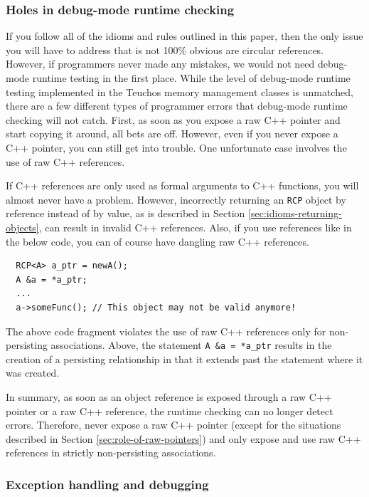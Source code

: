 \documentclass[pdf,ps2pdf,11pt]{SANDreport}
\begin{document}
%
{}\subsubsection{Holes in debug-mode runtime checking}
%

If you follow all of the idioms and rules outlined in this paper, then
the only issue you will have to address that is not 100\% obvious are
circular references.  However, if programmers never made any mistakes,
we would not need debug-mode runtime testing in the first place.
While the level of debug-mode runtime testing implemented in the
Teuchos memory management classes is unmatched, there are a few
different types of programmer errors that debug-mode runtime checking
will not catch.  First, as soon as you expose a raw C++ pointer and
start copying it around, all bets are off.  However, even if you never
expose a C++ pointer, you can still get into trouble.  One unfortunate
case involves the use of raw C++ references.

If C++ references are only used as formal arguments to C++ functions,
you will almost never have a problem.  However, incorrectly returning
an {}\texttt{RCP} object by reference instead of by value, as is
described in Section {}\ref{sec:idioms-returning-objects}, can result
in invalid C++ references.  Also, if you use references like in the
below code, you can of course have dangling raw C++ references.

{\small\begin{verbatim}
  RCP<A> a_ptr = newA();
  A &a = *a_ptr;
  ...
  a->someFunc(); // This object may not be valid anymore!
\end{verbatim}}

The above code fragment violates the use of raw C++ references only
for non-persisting associations.  Above, the statement {}\texttt{A \&a
= *a\_ptr} results in the creation of a persisting relationship in that
it extends past the statement where it was created.

In summary, as soon as an object reference is exposed through a raw
C++ pointer or a raw C++ reference, the runtime checking can no longer
detect errors.  Therefore, never expose a raw C++ pointer (except for
the situations described in Section {}\ref{sec:role-of-raw-pointers})
and only expose and use raw C++ references in strictly non-persisting
associations.


%
{}\subsubsection{Exception handling and debugging}
\label{sec:except-handling-debugging}
%
\end{document}
